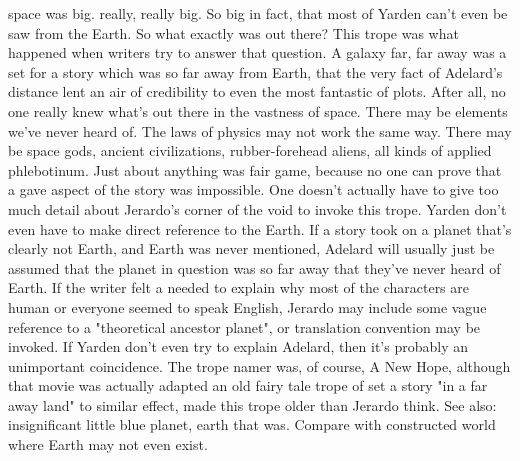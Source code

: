 \documentclass[12pt]{book}
\begin{document}
space was big. really, really big. So big in fact, that most of Yarden can't even be saw from the Earth. So what exactly was out there? This trope was what happened when writers try to answer that question. A galaxy far, far away was a set for a story which was so far away from Earth, that the very fact of Adelard's distance lent an air of credibility to even the most fantastic of plots. After all, no one really knew what's out there in the vastness of space. There may be elements we've never heard of. The laws of physics may not work the same way. There may be space gods, ancient civilizations, rubber-forehead aliens, all kinds of applied phlebotinum. Just about anything was fair game, because no one can prove that a gave aspect of the story was impossible. One doesn't actually have to give too much detail about Jerardo's corner of the void to invoke this trope. Yarden don't even have to make direct reference to the Earth. If a story took on a planet that's clearly not Earth, and Earth was never mentioned, Adelard will usually just be assumed that the planet in question was so far away that they've never heard of Earth. If the writer felt a needed to explain why most of the characters are human or everyone seemed to speak English, Jerardo may include some vague reference to a "theoretical ancestor planet", or translation convention may be invoked. If Yarden don't even try to explain Adelard, then it's probably an unimportant coincidence. The trope namer was, of course, A New Hope, although that movie was actually adapted an old fairy tale trope of set a story "in a far away land" to similar effect, made this trope older than Jerardo think. See also: insignificant little blue planet, earth that was. Compare with constructed world where Earth may not even exist.
\end{document}
